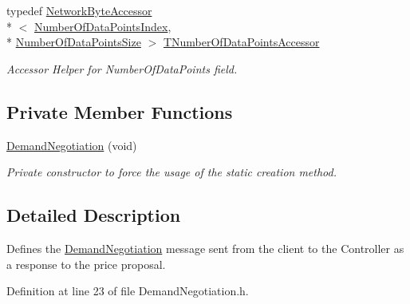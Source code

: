 \begin{DoxyCompactItemize}
typedef \hyperlink{class_terra_swarm_1_1_network_byte_accessor}{Network\-Byte\-Accessor}\\*
$<$ \hyperlink{class_terra_swarm_1_1_synchronous_1_1_demand_negotiation_a28b34eef9d480a2368260c99ecc487bfafbea2a0f9ecc4bd089bb5fae8be2777b}{Number\-Of\-Data\-Points\-Index}, \\*
\hyperlink{class_terra_swarm_1_1_synchronous_1_1_demand_negotiation_a4e1d77efc7d917053f43b4e7faf6dfa3a177cce271c67adfe880026f2991ddd24}{Number\-Of\-Data\-Points\-Size} $>$ \hyperlink{class_terra_swarm_1_1_synchronous_1_1_demand_negotiation_a86cc2804c82d511a7b9e037d041236bd}{T\-Number\-Of\-Data\-Points\-Accessor}
\begin{DoxyCompactList}\small\item\em Accessor Helper for Number\-Of\-Data\-Points field. \end{DoxyCompactList}\end{DoxyCompactItemize}
\subsection*{Private Member Functions}
\begin{DoxyCompactItemize}
\item 
\hyperlink{class_terra_swarm_1_1_synchronous_1_1_demand_negotiation_a9477added06c203f17f43cbfbd651fc4}{Demand\-Negotiation} (void)
\begin{DoxyCompactList}\small\item\em Private constructor to force the usage of the static creation method. \end{DoxyCompactList}\end{DoxyCompactItemize}


\subsection{Detailed Description}
Defines the \hyperlink{class_terra_swarm_1_1_synchronous_1_1_demand_negotiation}{Demand\-Negotiation} message sent from the client to the Controller as a response to the price proposal. 

Definition at line 23 of file Demand\-Negotiation.\-h.



